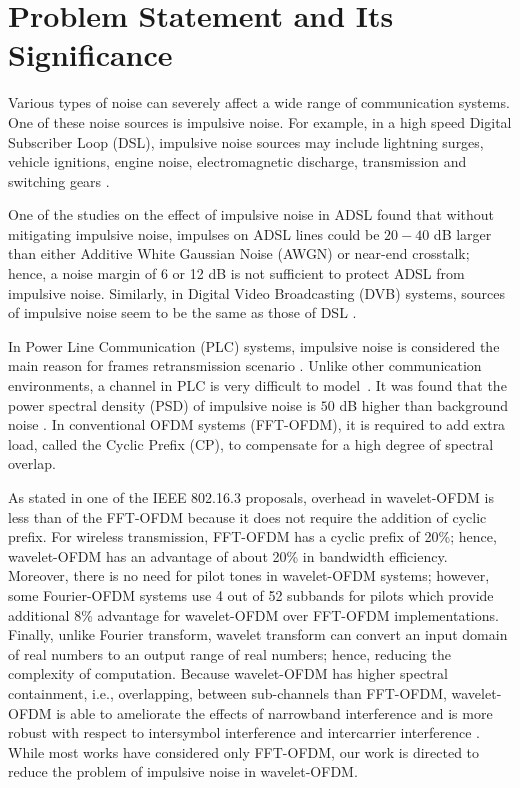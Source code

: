 	\section{Problem Statement and Its Significance}
		Various types of noise can severely affect a wide range of communication systems. One of these noise sources is impulsive noise. For example, in a high speed Digital Subscriber Loop (DSL), impulsive noise sources may include lightning surges, vehicle ignitions, engine noise, electromagnetic discharge, transmission and switching gears \cite{2006-zhidkov}. 
		\par One of the studies on the effect of impulsive noise in ADSL found that without mitigating impulsive noise,  impulses on ADSL lines could be  $ 20-40 $ dB larger than either Additive White Gaussian Noise (AWGN) or near-end crosstalk; hence,  a noise margin of 6 or 12 dB is not sufficient to protect ADSL from impulsive noise. Similarly, in Digital Video Broadcasting (DVB) systems, sources of impulsive noise seem to be the same as those of DSL \cite{2011-mawali}.
		\par In Power Line Communication (PLC) systems, impulsive noise is considered the main reason for frames retransmission scenario \cite{2009-Zbydniewski}. Unlike other communication environments, a channel in PLC is very difficult to model~\cite{2011-mawali}. It was found that the power spectral density (PSD) of impulsive noise is $ 50 $ dB higher than background noise \cite{2011-mawali}.
		In conventional OFDM systems (FFT-OFDM), it is required to add extra load, called the Cyclic Prefix (CP), to compensate for a high degree of spectral overlap.  
		\par As stated in one of the IEEE 802.16.3 proposals, overhead in wavelet-OFDM is less than  of the FFT-OFDM because it does not require the addition of cyclic prefix. For wireless transmission, FFT-OFDM has a cyclic prefix of 20\%; hence, wavelet-OFDM has an advantage of about 20\% in bandwidth efficiency. Moreover, there is no need for pilot tones in wavelet-OFDM systems; however, some Fourier-OFDM systems use 4 out of 52 subbands for pilots which provide additional 8\% advantage for wavelet-OFDM over FFT-OFDM implementations. Finally, unlike Fourier transform, wavelet transform can convert an input domain of real numbers to  an output range of real numbers; hence, reducing the complexity of computation. Because wavelet-OFDM has higher spectral containment, i.e., overlapping, between sub-channels than FFT-OFDM, wavelet-OFDM is able to ameliorate the effects of narrowband interference and is more robust with respect to intersymbol interference and intercarrier interference \cite{2004-zhao}.
		While most works  have considered only FFT-OFDM, our work is directed to reduce the problem of impulsive noise in wavelet-OFDM.
